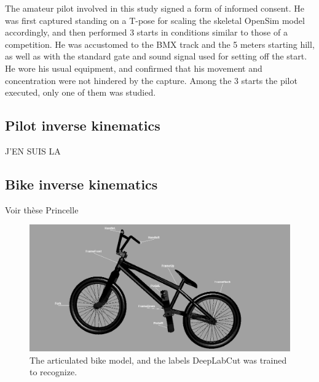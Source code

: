 The amateur pilot involved in this study signed a form of informed consent. He was first captured standing on a T-pose for scaling the skeletal OpenSim model accordingly, and then performed 3 starts in conditions similar to those of a competition. He was accustomed to the BMX track and the 5 meters starting hill, as well as with the standard gate and sound signal used for setting off the start. He wore his usual equipment, and confirmed that his movement and concentration were not hindered by the capture. Among the 3 starts the pilot executed, only one of them was studied. 


\subsection{Pilot inverse kinematics}


J'EN SUIS LA




\subsection{Bike inverse kinematics}

Voir thèse Princelle




\begin{figure}[hbtp]
	\centering
	\def\svgwidth{1\columnwidth}
	\fontsize{10pt}{10pt}\selectfont
	\includegraphics[width=\linewidth]{"../Chap7/Figures/Bike_keypoints.PNG"}
	\caption{The articulated bike model, and the labels DeepLabCut was trained to recognize.}
	\label{fig_bikemodel}
\end{figure}





